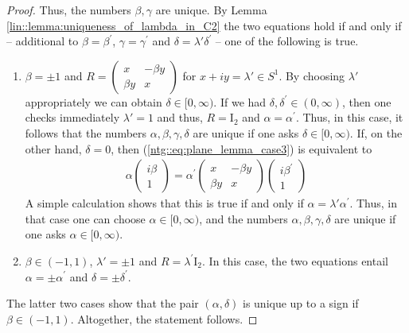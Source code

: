 \documentclass[10pt,a4paper]{amsart}
\begin{document}
\begin{proof}
    Thus, the numbers $\beta, \gamma$ are unique. 
    By Lemma \ref{lin::lemma:uniqueness_of_lambda_in_C2} the two equations hold if and only if -- additional to $\beta = \beta^\prime$, $\gamma = \gamma^\prime$ and $\delta = \lambda'\delta^\prime$ -- one of the following is true.
    \begin{enumerate}[label=(\alph*)]
        \item $\beta =\pm 1$ and $\displaystyle R = \begin{pmatrix}
            x & -\beta y \\
            \beta y & x
        \end{pmatrix}$
        for $x+ iy = \lambda' \in S^1$. By choosing $\lambda'$ appropriately we can obtain $\delta \in [0, \infty)$. If we had $\delta, \delta^\prime \in (0, \infty)$, then one checks immediately $\lambda' = 1$ and thus, $R=\mathrm{I}_2$ and $\alpha = \alpha^\prime$. Thus, in this case, it  follows that the numbers $\alpha, \beta, \gamma, \delta$ are unique if one asks $\delta \in [0, \infty)$. If, on the other hand, $\delta = 0$, then (\ref{ntg::eq:plane_lemma_case3}) is equivalent to
        \begin{align*}
            \alpha \begin{pmatrix}
                i \beta \\ 1
            \end{pmatrix}
            = \alpha^\prime 
            \begin{pmatrix}
                x & -\beta y \\
                \beta y & x
            \end{pmatrix}
            \begin{pmatrix}
                i \beta^\prime \\ 1
            \end{pmatrix}
        \end{align*}
        A simple calculation shows that this is true if and only if $\alpha = \lambda' \alpha^\prime$. 
        Thus, in that case one can choose $\alpha \in [0, \infty)$, and the numbers $\alpha, \beta, \gamma, \delta$ are unique if one asks $\alpha \in [0, \infty)$.
        \item $\beta \in (-1,1)$, $\lambda' = \pm 1$ and $R =\lambda^\prime \mathrm{I}_2$. In this case, the two equations entail $\alpha = \pm\alpha^\prime$ and $\delta = \pm\delta^\prime$.
    \end{enumerate}
    The latter two cases show that the pair $(\alpha, \delta)$ is unique up to a sign if $\beta \in (-1,1)$. Altogether, the statement follows.
\end{proof}
\end{document}
